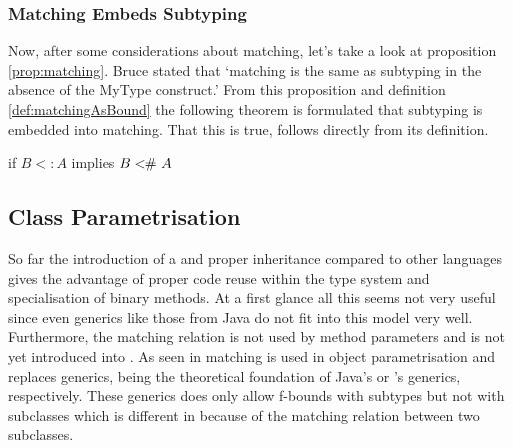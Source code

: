 \subsubsection{Matching Embeds Subtyping}
Now, after some considerations about matching, let's take a look at
proposition \ref{prop:matching}. Bruce stated that `matching is the
same as subtyping in the absence of the MyType construct.' From this
proposition and definition \ref{def:matchingAsBound} the following theorem
is formulated that subtyping is embedded into matching. That this is true,
follows directly from its definition.

\begin{prop}
	\label{prop:matchinIsSubtyping}
	if $B <: A$ implies $B <\!\!\#~ A$
\end{prop}
%
%

%


\subsection{Class Parametrisation}
\label{sec:classParametrisation}
So far the introduction of a \mytype and proper inheritance compared to
other languages gives the advantage of proper code reuse within the type
system and specialisation of binary methods. At a first glance all this
seems not very useful since even generics like those from Java do not fit
into this model very well. Furthermore, the matching relation is not used
by method parameters and is not yet introduced into \ooplss.  As seen
in  matching is used in object
parametrisation and replaces generics, being the theoretical foundation
of Java's or \cs's generics, respectively. These generics does only
allow f-bounds with subtypes but not with subclasses which is different
in \ooplss because of the matching relation between two subclasses.

